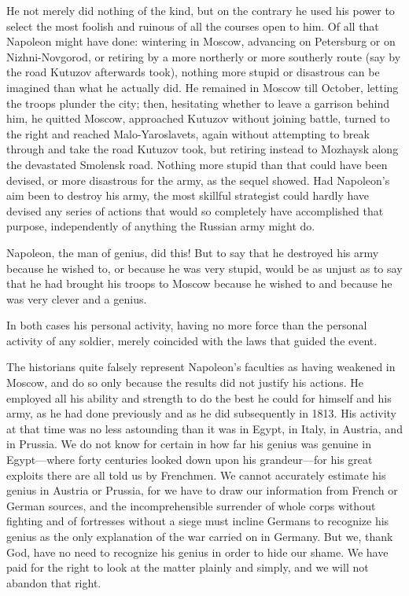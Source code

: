 He not merely did nothing of the kind, but on the contrary he
used his power to select the most foolish and ruinous of all the
courses open to him. Of all that Napoleon might have done:
wintering in Moscow, advancing on Petersburg or on
Nizhni-Novgorod, or retiring by a more northerly or more
southerly route (say by the road Kutuzov afterwards took),
nothing more stupid or disastrous can be imagined than what he
actually did. He remained in Moscow till October, letting the
troops plunder the city; then, hesitating whether to leave a
garrison behind him, he quitted Moscow, approached Kutuzov
without joining battle, turned to the right and reached
Malo-Yaroslavets, again without attempting to break through and
take the road Kutuzov took, but retiring instead to Mozhaysk
along the devastated Smolensk road. Nothing more stupid than that
could have been devised, or more disastrous for the army, as the
sequel showed. Had Napoleon's aim been to destroy his army, the
most skillful strategist could hardly have devised any series of
actions that would so completely have accomplished that purpose,
independently of anything the Russian army might do.

Napoleon, the man of genius, did this! But to say that he
destroyed his army because he wished to, or because he was very
stupid, would be as unjust as to say that he had brought his
troops to Moscow because he wished to and because he was very
clever and a genius.

In both cases his personal activity, having no more force than
the personal activity of any soldier, merely coincided with the
laws that guided the event.

The historians quite falsely represent Napoleon's faculties as
having weakened in Moscow, and do so only because the results did
not justify his actions. He employed all his ability and strength
to do the best he could for himself and his army, as he had done
previously and as he did subsequently in 1813. His activity at
that time was no less astounding than it was in Egypt, in Italy,
in Austria, and in Prussia. We do not know for certain in how far
his genius was genuine in Egypt---where forty centuries looked
down upon his grandeur---for his great exploits there are all
told us by Frenchmen. We cannot accurately estimate his genius in
Austria or Prussia, for we have to draw our information from
French or German sources, and the incomprehensible surrender of
whole corps without fighting and of fortresses without a siege
must incline Germans to recognize his genius as the only
explanation of the war carried on in Germany. But we, thank God,
have no need to recognize his genius in order to hide our
shame. We have paid for the right to look at the matter plainly
and simply, and we will not abandon that right.

